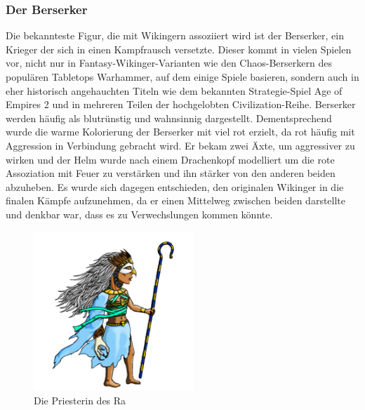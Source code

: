 \documentclass[extern,palatino]{cgBA}
\begin{document}
\subsubsection{Der Berserker}
Die bekannteste Figur, die mit Wikingern assoziiert wird ist der Berserker, ein Krieger der sich in einen Kampfrausch versetzte. Dieser kommt in vielen Spielen vor, nicht nur in Fantasy-Wikinger-Varianten wie den Chaos-Berserkern des populären Tabletops Warhammer, auf dem einige Spiele basieren, sondern auch in eher historisch angehauchten Titeln wie dem bekannten Strategie-Spiel Age of Empires 2 und in mehreren Teilen der hochgelobten  Civilization-Reihe. Berserker werden häufig als blutrünstig und wahnsinnig dargestellt. Dementsprechend wurde die warme Kolorierung der Berserker mit viel rot erzielt, da rot häufig mit Aggression in Verbindung gebracht wird. Er bekam zwei Äxte, um aggressiver zu wirken und der Helm wurde nach einem Drachenkopf modelliert um die rote Assoziation mit Feuer zu verstärken und ihn stärker von den anderen beiden abzuheben. Es wurde sich dagegen entschieden, den originalen Wikinger in die finalen Kämpfe aufzunehmen, da er einen Mittelweg zwischen beiden darstellte und denkbar war, dass es zu Verwechslungen kommen könnte.
	\newpage
\begin{figure}[H]
	\centering
	\includegraphics[height=6cm]{priestess.jpg}
	\caption{Die Priesterin des Ra}
	\label{priestess}
\end{figure}
\end{document}
